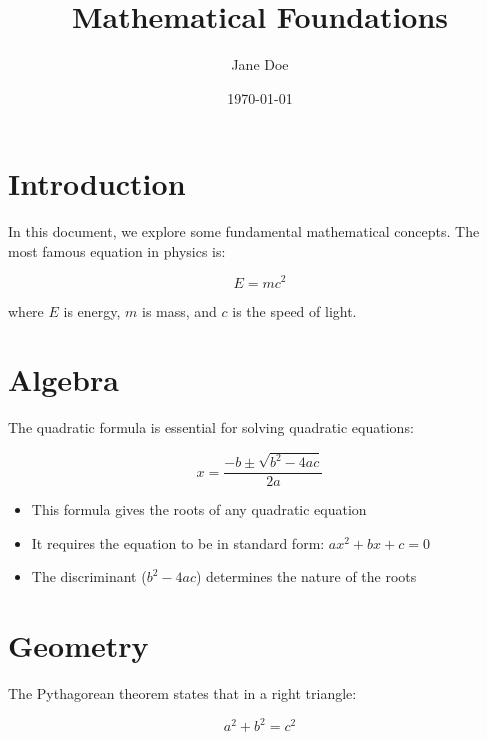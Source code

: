 \documentclass{article}
\title{Mathematical Foundations}
\author{Jane Doe}
\date{\today}
\begin{document}
\maketitle

\section{Introduction}

In this document, we explore some fundamental mathematical concepts. The most famous equation in physics is:

\begin{equation}
  E = mc^2
\end{equation}

where $E$ is energy, $m$ is mass, and $c$ is the speed of light.

\section{Algebra}

The quadratic formula is essential for solving quadratic equations:

\begin{equation*}
  x = \frac{-b \pm \sqrt{b^2 - 4ac}}{2a}
\end{equation*}

\begin{itemize}
  \item This formula gives the roots of any quadratic equation
  \item It requires the equation to be in standard form: $ax^2 + bx + c = 0$
  \item The discriminant ($b^2 - 4ac$) determines the nature of the roots
\end{itemize}

\section{Geometry}

The Pythagorean theorem states that in a right triangle:

\begin{equation}
  a^2 + b^2 = c^2
\end{equation}
\end{document}
